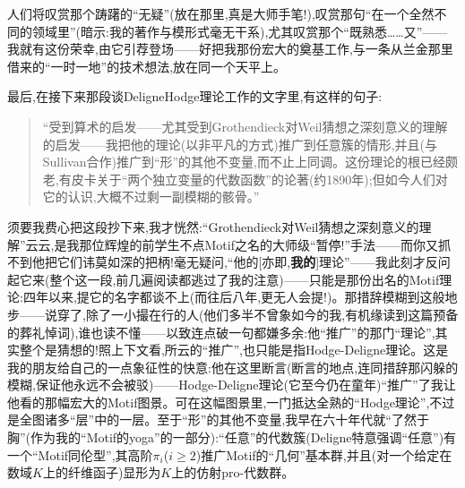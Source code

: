 人们将叹赏那个踌躇的“无疑”(放在那里,真是大师手笔!),叹赏那句“在一个全然不同的领域里”(暗示:我的著作与模形式毫无干系),尤其叹赏那个“既熟悉……又”——我就有这份荣幸,由它引荐登场——好把我那份宏大的奠基工作,与一条从兰金那里借来的“一时一地”的技术想法,放在同一个天平上。

最后,在接下来那段谈DeligneHodge理论工作的文字里,有这样的句子:

\begin{quote}
“受到算术的启发\dmark{}——尤其受到Grothendieck对Weil猜想之深刻意义的理解的启发——我把他的理论(以非平凡的方式)推广到任意簇的情形,并且(与Sullivan合作)推广到“形”的其他不变量,而不止上同调。这份理论的根已经颇老,有皮卡关于“两个独立变量的代数函数”的论著(约1890年);但如今人们对它的认识,大概不过剩一副模糊的骸骨。”\end{quote}

须要我费心把这段抄下来,我才恍然:“Grothendieck对Weil猜想之深刻意义的理解”云云,是我那位辉煌的前学生不点Motif之名的大师级“暂停!”手法——而你又抓不到他把它们讳莫如深的把柄!毫无疑问,“他的[亦即,\textbf{我的}]理论”——我此刻才反问起它来(整个这一段,前几遍阅读都逃过了我的注意)——只能是那份出名的Motif理论:四年以来,提它的名字都谈不上(而往后八年,更无人会提!)。那措辞模糊到这般地步——说穿了,除了一小撮在行的人(他们多半不曾象如今的我,有机缘读到这篇预备的葬礼悼词),谁也读不懂——以致连点破一句都嫌多余:他“推广”的那门“理论”,其实整个是猜想的!照上下文看,所云的“推广”,也只能是指Hodge-Deligne理论。这是我的朋友给自己的一点象征性的快意:他在这里断言(断言的地点,连同措辞那闪躲的模糊,保证他永远不会被驳)——Hodge-Deligne理论(它至今仍在童年)“推广”了我让他看的那幅宏大的Motif图景。可在这幅图景里,一门抵达全熟的“Hodge理论”,不过是全图诸多“层”中的一层。至于“形”的其他不变量,我早在六十年代就“了然于胸”(作为我的“Motif的yoga”的一部分):“任意”的代数簇(Deligne特意强调“任意”)有一个“Motif同伦型”,其高阶$\pi_i$($i\ge 2$)推广Motif的“几何”基本群,并且(对一个给定在数域$K$上的纤维函子)显形为$K$上的仿射pro-代数群。

